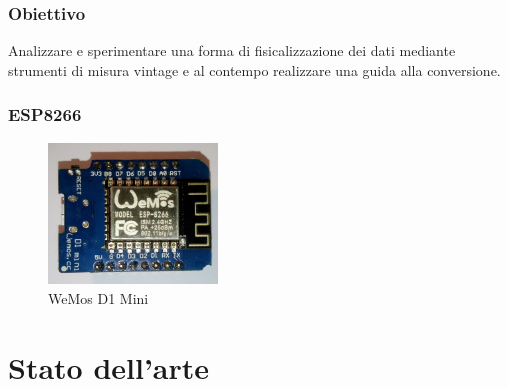 \documentclass[aspectratio=169]{beamer}
\begin{document}
\begin{frame}
\frametitle{Obiettivo}
Analizzare e sperimentare una forma di fisicalizzazione dei dati mediante strumenti di misura vintage e al contempo realizzare una guida alla conversione.

\end{frame}

\begin{frame}
\frametitle{ESP8266}
\begin{figure}[h]
  \centering
  \includegraphics[width=0.4\textwidth]{wd1mini}
  \caption{WeMos D1 Mini\autocite{wiki:wd1mini}}
\end{figure}

\end{frame}

\section{Stato dell'arte}
\end{document}
